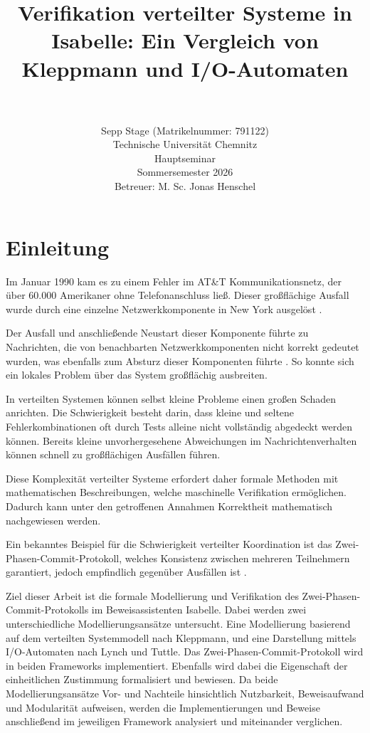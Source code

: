 \documentclass[12pt,a4paper]{tucarticle2019}
\author{\\\\Sepp Stage (Matrikelnummer: 791122)\\Technische Universität Chemnitz\\Hauptseminar\\Sommersemester 2026\\Betreuer: M. Sc. Jonas Henschel}
\title{Verifikation verteilter Systeme in Isabelle: Ein Vergleich von Kleppmann und I/O-Automaten}
\begin{document}
	\justifying
	\maketitle
	\newpage
	\tableofcontents	
	\newpage
	\section{Einleitung}


	Im Januar 1990 kam es zu einem Fehler im AT\&T Kommunikationsnetz, der über 60.000 Amerikaner ohne Telefonanschluss ließ. Dieser großflächige Ausfall wurde durch eine einzelne Netzwerkkomponente in New York ausgelöst \cite{atat}.
	
	Der Ausfall und anschließende Neustart dieser Komponente führte zu Nachrichten, die von benachbarten Netzwerkkomponenten nicht korrekt gedeutet wurden, was ebenfalls zum Absturz dieser Komponenten führte \cite{atat2}. So konnte sich ein lokales Problem über das System großflächig ausbreiten.
	
	In verteilten Systemen können selbst kleine Probleme einen großen Schaden anrichten. Die Schwierigkeit besteht darin, dass kleine und seltene Fehlerkombinationen oft durch Tests alleine nicht vollständig abgedeckt werden können. Bereits kleine unvorhergesehene Abweichungen im Nachrichtenverhalten können schnell zu großflächigen Ausfällen führen.
	
	Diese Komplexität verteilter Systeme erfordert daher formale Methoden mit mathematischen Beschreibungen, welche maschinelle Verifikation ermöglichen. Dadurch kann unter den getroffenen Annahmen Korrektheit mathematisch nachgewiesen werden.
	
	Ein bekanntes Beispiel für die Schwierigkeit verteilter Koordination ist das Zwei-Phasen-Commit-Protokoll, welches Konsistenz zwischen mehreren Teilnehmern garantiert, jedoch empfindlich gegenüber Ausfällen ist \cite{kleppmannbook}.
	
	Ziel dieser Arbeit ist die formale Modellierung und Verifikation des Zwei-Phasen-Commit-Protokolls im Beweisassistenten Isabelle. Dabei werden zwei unterschiedliche Modellierungsansätze untersucht. Eine Modellierung basierend auf dem verteilten Systemmodell nach Kleppmann, und eine Darstellung mittels I/O-Automaten nach Lynch und Tuttle. 
	Das Zwei-Phasen-Commit-Protokoll wird in beiden Frameworks implementiert. Ebenfalls wird dabei die Eigenschaft der einheitlichen Zustimmung formalisiert und bewiesen. Da beide Modellierungsansätze Vor- und Nachteile hinsichtlich Nutzbarkeit, Beweisaufwand und Modularität aufweisen, werden die Implementierungen und Beweise anschließend im jeweiligen Framework analysiert und miteinander verglichen.
	
\end{document}
